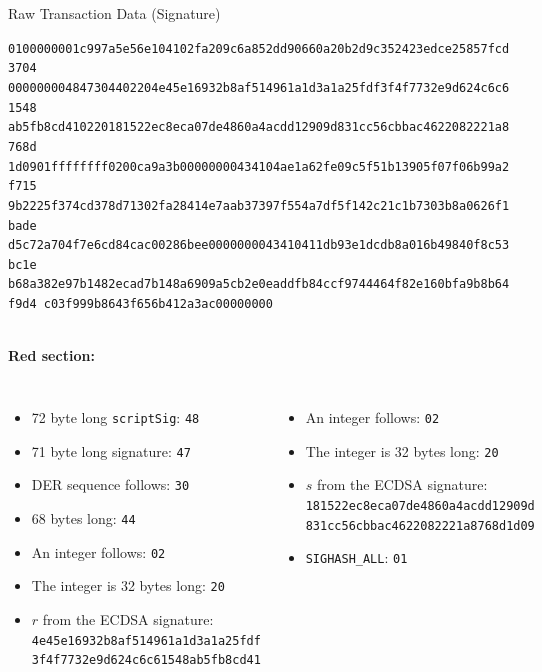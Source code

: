 \documentclass[]{beamer}
\begin{document}
\begin{frame}{Raw Transaction Data (Signature)}
	\begin{scriptsize}
\texttt{\textcolor{black!50}{0100000001c997a5e56e104102fa209c6a852dd90660a20b2d9c352423edce25857fcd3704
00000000}{\alert<1>{48}\alert<2>{47}\alert<3>{30}\alert<4>{44}\alert<5>{02}\alert<6>{20}\alert<7>{4e45e16932b8af514961a1d3a1a25fdf3f4f7732e9d624c6c61548
ab5fb8cd41}\alert<8>{02}\alert<9>{20}\alert<10>{181522ec8eca07de4860a4acdd12909d831cc56cbbac4622082221a8768d
1d09}\alert<11>{01}}\textcolor{black!50}{ffffffff0200ca9a3b00000000434104ae1a62fe09c5f51b13905f07f06b99a2f715
9b2225f374cd378d71302fa28414e7aab37397f554a7df5f142c21c1b7303b8a0626f1bade
d5c72a704f7e6cd84cac00286bee0000000043410411db93e1dcdb8a016b49840f8c53bc1e
b68a382e97b1482ecad7b148a6909a5cb2e0eaddfb84ccf9744464f82e160bfa9b8b64f9d4
c03f999b8643f656b412a3ac00000000}}
\end{scriptsize}
\vspace{1em}
\scriptsize \\
\textbf{Red section:}\\
\begin{columns}[T]
\begin{itemize}
	\item \alert<1>{72 byte long \texttt{scriptSig}: \texttt{48}}
	\item \alert<2>{71 byte long signature: \texttt{47}}
	\item \alert<3>{DER sequence follows: \texttt{30}}
	\item \alert<4>{68 bytes long: \texttt{44}}
	\item \alert<5>{An integer follows: \texttt{02}}
	\item \alert<6>{The integer is 32 bytes long: \texttt{20}}
	\item \alert<7>{$r$ from the ECDSA signature: 	\texttt{4e45e16932b8af514961a1d3a1a25fdf\\3f4f7732e9d624c6c61548ab5fb8cd41}}
\end{itemize}
\begin{itemize}
	\item \alert<8>{An integer follows: \texttt{02}}
	\item \alert<9>{The integer is 32 bytes long: \texttt{20}}
	\item \alert<10>{$s$ from the ECDSA signature: \texttt{181522ec8eca07de4860a4acdd12909d\\831cc56cbbac4622082221a8768d1d09}}
	\item \alert<11>{\texttt{SIGHASH\_ALL}: \texttt{01}}
\end{itemize}
\end{columns}
\end{frame}
\end{document}
